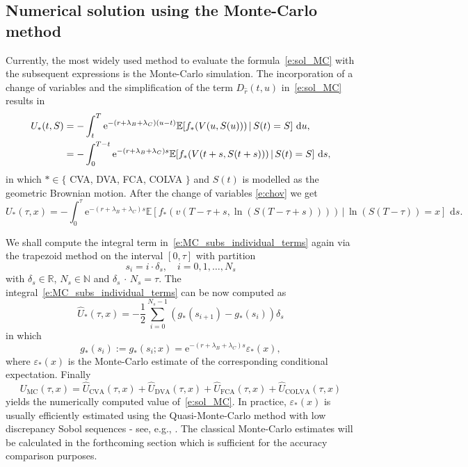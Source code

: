 \documentclass[a4paper,10pt]{article}
\renewcommand{\d}{\,\mathrm{d}}
\newcommand{\e}{\mathrm{e}}
\newcommand{\E}{\mathbb{E}}
\newcommand{\1}{\mathbf{1}}
\begin{document}
{\subsection{Numerical solution using the Monte-Carlo method}
\label{sec:meth_MC}

Currently, the most widely used method to evaluate the formula~\eqref{e:sol_MC} with the subsequent expressions is the Monte-Carlo simulation. The incorporation of a change of variables and the simplification of the term $D_{\hat{r}}(t,u)$ in~\eqref{e:sol_MC} results in
\begin{align}
U_*(t,S) &= - \int_t^T \e^{-(r+\lambda_B+\lambda_C)(u-t)}\E[f_*(V(u,S(u))) \, | \, S(t) = S] \, \d u, \notag \\
&= - \int_0^{T-t} \e^{-(r+\lambda_B+\lambda_C)s} \E[f_*(V(t+s,S(t+s))) \, | \, S(t) = S] \, \d s, 
\end{align}
in which $* \in \{$ CVA, DVA, FCA, COLVA $\}$ and $S(t)$ is modelled as the geometric Brownian motion. After the change of variables \eqref{e:chov} we get
\begin{equation}
U_*(\tau,x) = - \int_0^\tau \e^{-(r+\lambda_B+\lambda_C)s}\E[f_*(v(T-\tau+s,\ln(S(T-\tau+s)))) \, | \, \ln(S(T-\tau)) = x] \, \d s. \label{e:MC_subs_individual_terms}
\end{equation}

We shall compute the integral term in~\eqref{e:MC_subs_individual_terms} again via the trapezoid method on the interval $[0,\tau]$ with partition
\begin{equation} \label{e:MC_time_partition}
s_i = i \cdot \delta_s, \quad i= 0, 1, \ldots, N_s 
\end{equation}
with $\delta_s \in \mathbb{R}$, $N_s \in \mathbb{N}$ and $\delta_s \, \cdot \, N_s = \tau$. 
The integral~\eqref{e:MC_subs_individual_terms} can be now computed as
\begin{equation}
\hat{U}_*(\tau,x) = - \frac{1}{2} \sum_{i=0}^{N_s-1} (g_*(s_{i+1})-g_*(s_{i})) \delta_s
\end{equation}
in which
\[
g_*(s_i) := g_*(s_i;x) = \e^{-(r+\lambda_B+\lambda_C)s} \varepsilon_*(x),  %
\]
where $\varepsilon_*(x)$ is the Monte-Carlo estimate of the corresponding conditional expectation.
Finally 
\begin{equation} \label{e:MC_trap_integral}
U_{\text{MC}}(\tau,x) = \hat{U}_{\text{CVA}}(\tau,x) + \hat{U}_{\text{DVA}}(\tau,x) + \hat{U}_{\text{FCA}}(\tau,x) + \hat{U}_{\text{COLVA}}(\tau,x)
\end{equation}
yields the numerically computed value of~\eqref{e:sol_MC}. In practice, $\varepsilon_*(x)$ is usually efficiently estimated using the Quasi-Monte-Carlo method with low discrepancy Sobol sequences - see, e.g., \cite{Renzitti20}. The classical Monte-Carlo estimates will be calculated in the forthcoming section which is sufficient for the accuracy comparison purposes.

}
\end{document}
